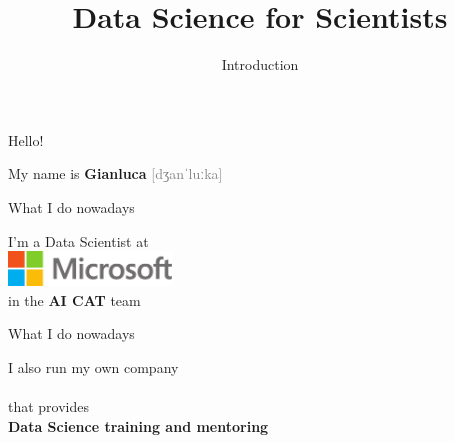 

\title{Data Science for Scientists}
\subtitle{Introduction}



\maketitle

\begin{frame}{Hello!}
    \begin{center}
        \LARGE%
        My name is \textbf{Gianluca}
        {\textcolor{gray}{[dʒanˈluːka]}}
    \end{center}
\end{frame}

\begin{frame}{What I do nowadays}
    \Large%
    \begin{center}
        I'm a Data Scientist at \\[\bigskipamount]
        \includegraphics[height=2.5em]{figures/microsoft} \\[\medskipamount]
        in the \textbf{AI CAT} team
    \end{center}
\end{frame}

{
\begin{frame}
\end{frame}}

\begin{frame}{What I do nowadays}
    \Large%
    \begin{center}
        I also run my own company \\[\bigskipamount]
         \\[\medskipamount]
        that provides \\
        \textbf{Data Science training and mentoring}
    \end{center}
\end{frame}

